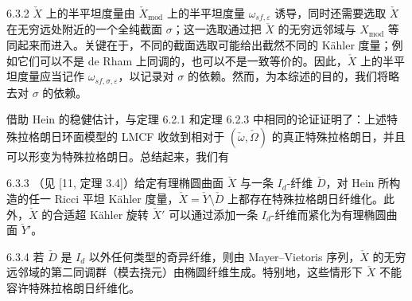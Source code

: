 \begin{remark}{6.3.2}
$\check X$ 上的半平坦度量由 $\check X_{\mathrm{mod}}$ 上的半平坦度量 $\omega_{sf,\varepsilon}$ 诱导，同时还需要选取 $\check X$ 在无穷远处附近的一个全纯截面 $\sigma$；这一选取通过把 $\check X$ 的无穷远邻域与 $X_{\mathrm{mod}}$ 等同起来而进入。关键在于，不同的截面选取可能给出截然不同的 Kähler 度量；例如它们可以不是 de Rham 上同调的，也可以不是一致等价的。因此，$\check X$ 上的半平坦度量应当记作 $\omega_{sf,\sigma,\varepsilon}$，以记录对 $\sigma$ 的依赖。然而，为本综述的目的，我们将略去对 $\sigma$ 的依赖。
\end{remark}

借助 Hein 的稳健估计，与定理 6.2.1 和定理 6.2.3 中相同的论证证明了：上述特殊拉格朗日环面模型的 LMCF 收敛到相对于 $(\check\omega,\check\Omega)$ 的真正特殊拉格朗日，并且可以形变为特殊拉格朗日。总结起来，我们有

\begin{theorem}{6.3.3}
（见 [11, 定理 3.4]）给定有理椭圆曲面 $\check X$ 与一条 $I_d$-纤维 $\check D$，对 Hein 所构造的任一 Ricci 平坦 Kähler 度量，$\check X=\check Y\setminus\check D$ 上都存在特殊拉格朗日纤维化。此外，$\check X$ 的合适超 Kähler 旋转 $\check X'$ 可以通过添加一条 $I_d$-纤维而紧化为有理椭圆曲面 $\check Y'$。
\end{theorem}

\begin{remark}{6.3.4}
若 $\check D$ 是 $I_d$ 以外任何类型的奇异纤维，则由 Mayer--Vietoris 序列，$\check X$ 的无穷远邻域的第二同调群（模去挠元）由椭圆纤维生成。特别地，这些情形下 $\check X$ 不能容许特殊拉格朗日纤维化。
\end{remark}

